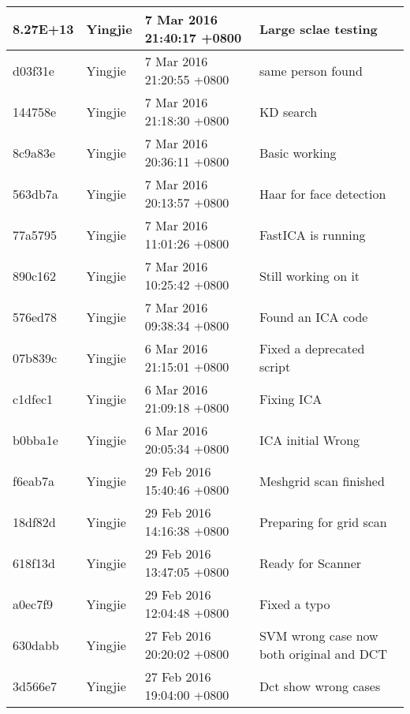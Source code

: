 \begin{longtable}{@{\extracolsep{\fill}}l|l|l|l@{}}
    8.27E+13 & Yingjie &  7 Mar 2016 21:40:17 +0800  & Large sclae testing                                  \\ \hline
    d03f31e  & Yingjie &  7 Mar 2016 21:20:55 +0800  & same person found                                    \\ \hline
    144758e  & Yingjie &  7 Mar 2016 21:18:30 +0800  & KD search                                            \\ \hline
    8c9a83e  & Yingjie &  7 Mar 2016 20:36:11 +0800  & Basic working                                        \\ \hline
    563db7a  & Yingjie &  7 Mar 2016 20:13:57 +0800  & Haar for face detection                              \\ \hline
    77a5795  & Yingjie &  7 Mar 2016 11:01:26 +0800  & FastICA is running                                   \\ \hline
    890c162  & Yingjie &  7 Mar 2016 10:25:42 +0800  & Still working on it                                  \\ \hline
    576ed78  & Yingjie &  7 Mar 2016 09:38:34 +0800  & Found an ICA code                                    \\ \hline
    07b839c  & Yingjie &  6 Mar 2016 21:15:01 +0800  & Fixed a deprecated script                            \\ \hline
    c1dfec1  & Yingjie &  6 Mar 2016 21:09:18 +0800  & Fixing ICA                                           \\ \hline
    b0bba1e  & Yingjie &  6 Mar 2016 20:05:34 +0800  & ICA initial Wrong                                    \\ \hline
    f6eab7a  & Yingjie &  29 Feb 2016 15:40:46 +0800 & Meshgrid scan finished                               \\ \hline
    18df82d  & Yingjie &  29 Feb 2016 14:16:38 +0800 & Preparing for grid scan                              \\ \hline
    618f13d  & Yingjie &  29 Feb 2016 13:47:05 +0800 & Ready for Scanner                                    \\ \hline
    a0ec7f9  & Yingjie &  29 Feb 2016 12:04:48 +0800 & Fixed a typo                                         \\ \hline
    630dabb  & Yingjie &  27 Feb 2016 20:20:02 +0800 & SVM wrong case now both original and DCT             \\ \hline
    3d566e7  & Yingjie &  27 Feb 2016 19:04:00 +0800 & Dct show wrong cases                                 \\ \hline

\end{longtable}
